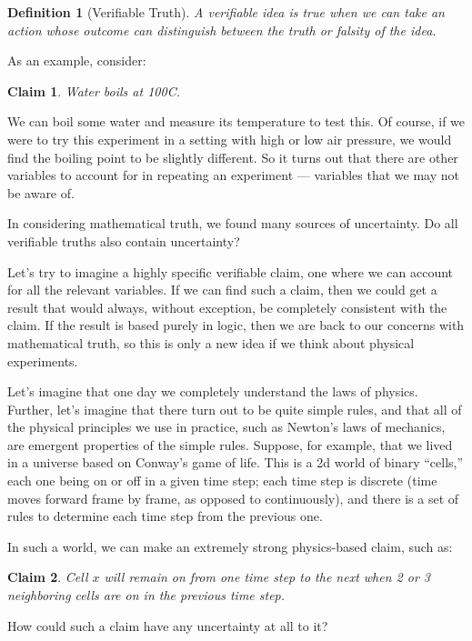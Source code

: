 \documentclass[11pt, oneside]{article}   	%
\newtheorem{defn}{Definition}
\newtheorem{claim}{Claim}
\begin{document}
\begin{defn}[Verifiable Truth]
    A verifiable idea is true when we can take an action whose outcome can
    distinguish between the truth or falsity of the idea.
\end{defn}

As an example, consider:
\begin{claim}
    Water boils at 100\/\degree C.
\end{claim}
We can boil some water and measure its temperature to test this.
Of course,
if we were to try this experiment in a setting with high or low air pressure, we
would find the boiling point to be slightly different. So it turns out that
there are other variables to account for in repeating an experiment ---
variables that we may not be aware of.

In considering mathematical truth, we found many sources of uncertainty.
Do all verifiable truths also contain uncertainty?

Let's try to imagine a highly specific verifiable claim, one where we can
account for all the relevant variables. If we can find such a claim, then we
could get a result that would always, without exception, be completely
consistent with the claim. If the result is based purely in logic, then we are
back to our concerns with mathematical truth, so this is only a new idea if we
think about physical experiments.

Let's imagine that one day we completely understand the laws of physics.
Further, let's imagine that there turn out to be quite simple rules, and that
all of the physical principles we use in practice, such as Newton's laws of
mechanics, are emergent properties of the simple rules. Suppose, for example,
that we lived in a universe based on Conway's game of life. This is a 2d world
of binary ``cells,'' each one being on or off in a given time step; each time
step is discrete (time moves forward frame by frame, as opposed to
continuously), and there is a set of rules to determine each time step from the
previous one.


In such a world, we can make an extremely strong physics-based claim, such as:
\begin{claim}
    Cell $x$ will remain on from one time step to the next when 2 or 3
    neighboring cells are on in the previous time step.
\end{claim}

How could such a claim have any uncertainty at all to it?
\end{document}
